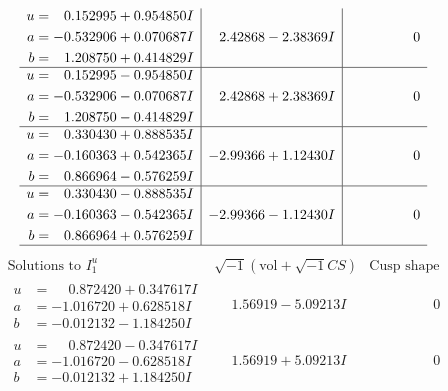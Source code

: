 \documentclass[1p]{elsarticle_modified}
\theoremstyle{definition}
\newcommand{\I}{\sqrt{-1}}
\begin{document}
$$\begin{array}{c|c|c}
\begin{aligned}
u &= \phantom{-}0.152995 + 0.954850 I \\
a &= -0.532906 + 0.070687 I \\
b &= \phantom{-}1.208750 + 0.414829 I\end{aligned}
 & \phantom{-}2.42868 - 2.38369 I & \phantom{-0.000000 } 0 \\ \hline\begin{aligned}
u &= \phantom{-}0.152995 - 0.954850 I \\
a &= -0.532906 - 0.070687 I \\
b &= \phantom{-}1.208750 - 0.414829 I\end{aligned}
 & \phantom{-}2.42868 + 2.38369 I & \phantom{-0.000000 } 0 \\ \hline\begin{aligned}
u &= \phantom{-}0.330430 + 0.888535 I \\
a &= -0.160363 + 0.542365 I \\
b &= \phantom{-}0.866964 - 0.576259 I\end{aligned}
 & -2.99366 + 1.12430 I & \phantom{-0.000000 } 0 \\ \hline\begin{aligned}
u &= \phantom{-}0.330430 - 0.888535 I \\
a &= -0.160363 - 0.542365 I \\
b &= \phantom{-}0.866964 + 0.576259 I\end{aligned}
 & -2.99366 - 1.12430 I & \phantom{-0.000000 } 0\\
 \hline 
 \end{array}$$\newpage$$\begin{array}{c|c|c}  
\text{Solutions to }I^u_{1}& \I (\text{vol} + \sqrt{-1}CS) & \text{Cusp shape}\\
 \hline 
\begin{aligned}
u &= \phantom{-}0.872420 + 0.347617 I \\
a &= -1.016720 + 0.628518 I \\
b &= -0.012132 - 1.184250 I\end{aligned}
 & \phantom{-}1.56919 - 5.09213 I & \phantom{-0.000000 } 0 \\ \hline\begin{aligned}
u &= \phantom{-}0.872420 - 0.347617 I \\
a &= -1.016720 - 0.628518 I \\
b &= -0.012132 + 1.184250 I\end{aligned}
 & \phantom{-}1.56919 + 5.09213 I & \phantom{-0.000000 } 0 \\ \hline\begin{aligned}

\end{aligned}
\end{array}$$
\end{document}

